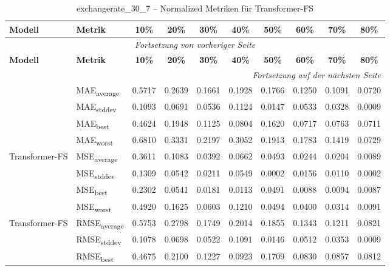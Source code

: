 {\small
\begin{longtable}{l l c c c c c c c c}
    \toprule
    \textbf{Modell} & \textbf{Metrik} & \textbf{10\%} & \textbf{20\%} & \textbf{30\%} & \textbf{40\%} & \textbf{50\%} & \textbf{60\%} & \textbf{70\%} & \textbf{80\%} \\
    \midrule
    \endfirsthead
    \multicolumn{10}{c}{\textit{Fortsetzung von vorheriger Seite}} \\
    \toprule
    \textbf{Modell} & \textbf{Metrik} & \textbf{10\%} & \textbf{20\%} & \textbf{30\%} & \textbf{40\%} & \textbf{50\%} & \textbf{60\%} & \textbf{70\%} & \textbf{80\%} \\
    \midrule
    \endhead
    \midrule
    \multicolumn{10}{r}{\textit{Fortsetzung auf der nächsten Seite}} \\
    \midrule
    \endfoot
    \bottomrule
    \caption{exchangerate_30_7 -- Normalized Metriken für Transformer-FS}
    \label{tab:exchangerate_30_7_normalized_transformer-fs}
    \endlastfoot
\multirow{4}{*}{Transformer-FS} & MAE\textsubscript{average} & 0.5717 & 0.2639 & 0.1661 & 0.1928 & 0.1766 & 0.1250 & 0.1091 & 0.0720 \\
 & MAE\textsubscript{stddev} & 0.1093 & 0.0691 & 0.0536 & 0.1124 & 0.0147 & 0.0533 & 0.0328 & 0.0009 \\
 & MAE\textsubscript{best} & 0.4624 & 0.1948 & 0.1125 & 0.0804 & 0.1620 & 0.0717 & 0.0763 & 0.0711 \\
 & MAE\textsubscript{worst} & 0.6810 & 0.3331 & 0.2197 & 0.3052 & 0.1913 & 0.1783 & 0.1419 & 0.0729 \\
\cmidrule(lr){2-10}
\multirow{4}{*}{Transformer-FS} & MSE\textsubscript{average} & 0.3611 & 0.1083 & 0.0392 & 0.0662 & 0.0493 & 0.0244 & 0.0204 & 0.0089 \\
 & MSE\textsubscript{stddev} & 0.1309 & 0.0542 & 0.0211 & 0.0549 & 0.0002 & 0.0156 & 0.0110 & 0.0002 \\
 & MSE\textsubscript{best} & 0.2302 & 0.0541 & 0.0181 & 0.0113 & 0.0491 & 0.0088 & 0.0094 & 0.0087 \\
 & MSE\textsubscript{worst} & 0.4920 & 0.1625 & 0.0603 & 0.1210 & 0.0494 & 0.0400 & 0.0314 & 0.0091 \\
\cmidrule(lr){2-10}
\multirow{4}{*}{Transformer-FS} & RMSE\textsubscript{average} & 0.5753 & 0.2798 & 0.1749 & 0.2014 & 0.1855 & 0.1343 & 0.1211 & 0.0821 \\
 & RMSE\textsubscript{stddev} & 0.1078 & 0.0698 & 0.0522 & 0.1091 & 0.0146 & 0.0512 & 0.0353 & 0.0009 \\
 & RMSE\textsubscript{best} & 0.4675 & 0.2100 & 0.1227 & 0.0923 & 0.1709 & 0.0830 & 0.0857 & 0.0812 \\

\end{longtable}}
